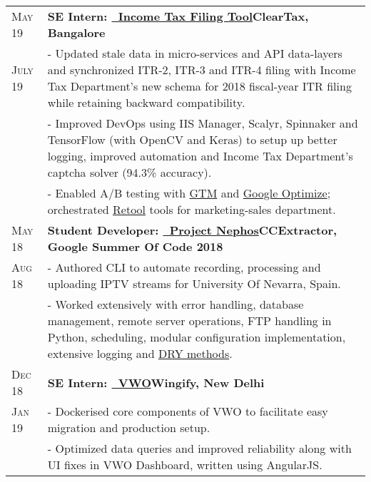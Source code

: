 \documentclass[a4paper,10pt]{extarticle} %
\begin{document}
\begin{tabularx}{\linewidth}{ l | X }

\textsc{May 19} & \textbf{SE Intern: {\href{https://cleartax.in/income-tax-efiling}{\ Income Tax Filing Tool}}}\hfill\textbf{ClearTax, Bangalore}\\
\textsc{July 19}& {- Updated stale data in micro-services and API data-layers and synchronized ITR-2, ITR-3 and ITR-4 filing with Income Tax Department's new schema for 2018 fiscal-year ITR filing while retaining backward compatibility.}\\
& {- Improved DevOps using IIS Manager, Scalyr, Spinnaker and TensorFlow (with OpenCV and Keras) to setup up better logging, improved automation and Income Tax Department's captcha solver (94.3\% accuracy).}\\
& {- Enabled A/B testing with \href{https://tagmanager.google.com/}{GTM} and \href{https://optimize.google.com/optimize/home/}{Google Optimize}; orchestrated \href{https://tryretool.com/}{Retool} tools for marketing-sales department.}\\[2mm]

\textsc{May 18} & \textbf{Student Developer: {\href{https://github.com/thealphadollar/Nephos}{\ Project Nephos}}}\hfill\textbf{CCExtractor, Google Summer Of Code 2018}\\
\textsc{Aug 18}& {- Authored CLI to automate recording, processing and uploading IPTV streams for University Of Nevarra, Spain.}\\
& {- Worked extensively with error handling, database management, remote server operations, FTP handling in Python, scheduling, modular configuration implementation, extensive logging and \href{https://thealphadollar.github.io/learning/2019/05/13/go-dry.html}{DRY methods}.}\\[2mm]

\textsc{Dec 18} & \textbf{SE Intern: {\href{https://vwo.com/}{\ VWO}}}\hfill\textbf{Wingify, New Delhi}\\
\textsc{Jan 19}& {- Dockerised core components of VWO to facilitate easy migration and production setup.}\\
& {- Optimized data queries and improved reliability along with UI fixes in VWO Dashboard, written using AngularJS.}\\

\end{tabularx}

\vspace{-0.1cm}
\end{document}
